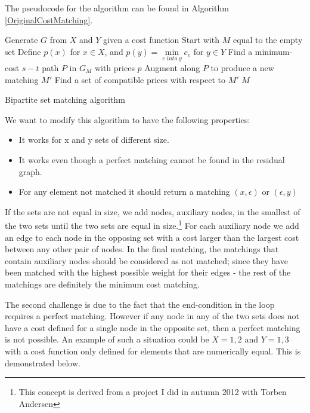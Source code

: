 \documentclass[11pt]{article}
\begin{document}
The pseudocode for the algorithm can be found in Algorithm \ref{OriginalCostMatching}.


\begin{algorithm}
\begin{algorithmic}
	\State Generate $G$ from $X$ and $Y$ given a cost function
	\State Start with $M$ equal to the empty set
	\State Define $p(x)$ for $x \in X$, and  $p(y) = \underset{e \; into \; y}{\operatorname{min}} c_e$ for $y \in Y$
    	\State Find a minimum-cost $s-t$ path $P$ in $G_M$ with prices $p$
    	\State Augment along $P$ to produce a new matching $M'$
    	\State Find a set of compatible prices with respect to $M'$
    \EndWhile
	\State \Return $M$
\EndFunction
\end{algorithmic}
	\caption{Bipartite set matching algorithm}
	\label{OriginalCostMatching}
\end{algorithm}

We want to modify this algorithm to have the following properties:

\begin{itemize}
\item It works for x and y sets of different size. 
\item It works even though a perfect matching cannot be found in the residual graph.
\item For any element not matched it should return a matching $(x, \epsilon)$ or $(\epsilon, y)$
\end{itemize}

If the sets are not equal in size, we add nodes, auxiliary nodes, in the smallest of the two sets until the two sets are equal in size.\footnote{This concept is derived from a project I did in autumn 2012 with Torben Andersen} For each auxiliary node we add an edge to each node in the opposing set with a cost larger than the largest cost between any other pair of nodes. In the final matching, the matchings that contain auxiliary nodes should be considered as not matched; since they have been matched with the highest possible weight for their edges - the rest of the matchings are definitely the minimum cost matching.

The second challenge is due to the fact that the end-condition in the loop requires a perfect matching. However if any node in any of the two sets does not have a cost defined for a single node in the opposite set, then a perfect matching is not possible. An example of such a situation could be $X={1, 2}$ and $Y={1, 3}$ with a cost function only defined for elements that are numerically equal. This is demonstrated below. \\
\end{document}
